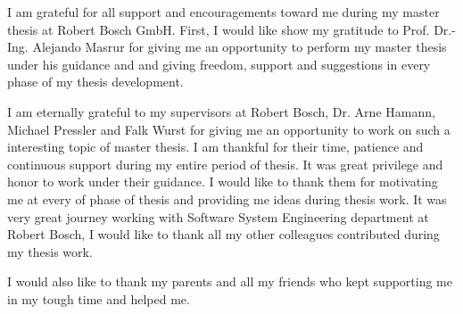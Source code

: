 \setlength{\parindent}{4em}
\setlength{\parskip}{1em}

I am grateful for all support and encouragements toward me during my master thesis at Robert Bosch GmbH. First, I would like show my gratitude to Prof. Dr.-Ing.  Alejando Masrur for giving me an opportunity to perform my master thesis under his guidance and  and giving freedom, support and suggestions in every phase of my thesis development. 

\par I am eternally grateful to my supervisors at Robert Bosch, Dr. Arne Hamann, Michael Pressler and Falk Wurst for giving me an opportunity to work on such a interesting topic of master thesis. I am thankful for their time, patience and continuous support during my entire period of thesis. It was great privilege and honor to work under their guidance. I would like to thank them for motivating me at every of phase of thesis and providing me ideas during thesis work. It was very great journey working with Software System Engineering department at Robert Bosch, I would like to thank all my other colleagues contributed during my thesis work.  

\par I would also like to thank my parents and all my friends who kept supporting me in my tough time and helped me. 